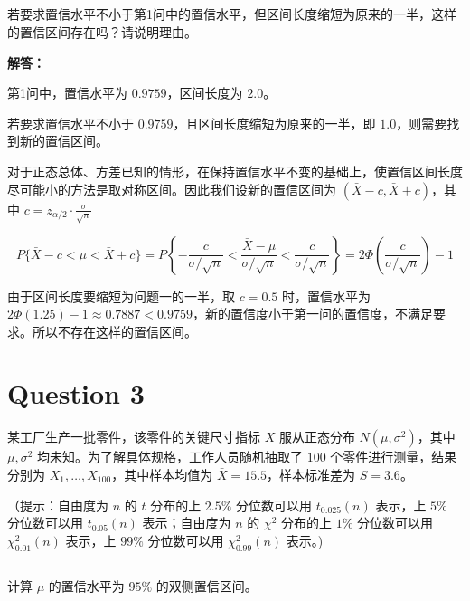 \documentclass[12pt,a4paper]{article}
\begin{document}
\subsection{}

若要求置信水平不小于第1问中的置信水平，但区间长度缩短为原来的一半，这样的置信区间存在吗？请说明理由。

\begin{answerbox}
\textbf{解答：}

第1问中，置信水平为 $0.9759$，区间长度为 $2.0$。

若要求置信水平不小于 $0.9759$，且区间长度缩短为原来的一半，即 $1.0$，则需要找到新的置信区间。

对于正态总体、方差已知的情形，在保持置信水平不变的基础上，使置信区间长度尽可能小的方法是取对称区间。因此我们设新的置信区间为 $(\bar{X} - c, \bar{X} + c)$，其中 $c = z_{\alpha/2} \cdot \frac{\sigma}{\sqrt{n}} $

$$
P\{\bar{X}-c < \mu < \bar{X}+c\} = P\left\{-\frac{c}{\sigma/\sqrt{n}} < \frac{\bar{X}-\mu}{\sigma/\sqrt{n}} < \frac{c}{\sigma/\sqrt{n}} \right\} = 2\Phi\left(\frac{c}{\sigma/\sqrt{n}}\right) - 1
$$

由于区间长度要缩短为问题一的一半，取 $c = 0.5$ 时，置信水平为 $2\Phi(1.25) - 1 \approx 0.7887 < 0.9759$，新的置信度小于第一问的置信度，不满足要求。所以不存在这样的置信区间。
\end{answerbox}

\section{Question 3}

某工厂生产一批零件，该零件的关键尺寸指标 $X$ 服从正态分布 $N(\mu,\sigma^2)$，其中 $\mu,\sigma^2$ 均未知。为了解具体规格，工作人员随机抽取了 $100$ 个零件进行测量，结果分别为 $X_1,\ldots,X_{100}$，其中样本均值为 $\bar{X} = 15.5$，样本标准差为 $S = 3.6$。

（提示：自由度为 $n$ 的 $t$ 分布的上 $2.5\%$ 分位数可以用 $t_{0.025}(n)$ 表示，上 $5\%$ 分位数可以用 $t_{0.05}(n)$ 表示；自由度为 $n$ 的 $\chi^2$ 分布的上 $1\%$ 分位数可以用 $\chi^2_{0.01}(n)$ 表示，上 $99\%$ 分位数可以用 $\chi^2_{0.99}(n)$ 表示。)

\subsection{}

计算 $\mu$ 的置信水平为 $95\%$ 的双侧置信区间。
\end{document}

